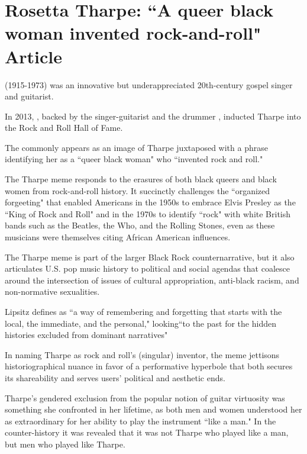 \documentclass[12pt, a4paper, twoside, openright, titlepage]{book}
\begin{document}
\section{Rosetta Tharpe: ``A queer black woman invented rock-and-roll" Article}


\begin{rmk}{}{}
     (1915-1973) was an innovative but underappreciated 20th-century gospel singer and guitarist.


    In 2013, , backed by the singer-guitarist  and the drummer , inducted Tharpe into the Rock and Roll Hall of Fame.
\end{rmk}

\begin{defn}{}{}
    The  commonly appears as an image of Tharpe juxtaposed with a phrase identifying her as a ``queer black woman" who ``invented rock and roll." 
\end{defn}

The Tharpe meme responds to the erasures of both black queers and black women from rock-and-roll history. It succinctly challenges the ``organized forgeeting" that enabled Americans in the 1950s to embrace Elvis Presley as the ``King of Rock and Roll" and in the 1970s to identify ``rock" with white British bands such as the Beatles, the Who, and the Rolling Stones, even as these musicians were themselves citing African American influences.

The Tharpe meme is part of the larger Black Rock counternarrative, but it also articulates U.S. pop music history to political and social agendas that coalesce around the intersection of issues of cultural appropriation, anti-black racism, and non-normative sexualities. 

\begin{defn}{}{}
    Lipsitz defines  as ``a way of remembering and forgetting that starts with the local, the immediate, and the personal," looking``to the past for the hidden histories excluded from dominant narratives"
\end{defn}

In naming Tharpe as rock and roll's (singular) inventor, the meme jettisons historiographical nuance in favor of a performative hyperbole that both secures its shareability and serves users' political and aesthetic ends.



Tharpe's gendered exclusion from the popular notion of guitar virtuosity was something she confronted in her lifetime, as both men and women understood her as extraordinary for her ability to play the instrument ``like a man." In the counter-history it was revealed that it was not Tharpe who played like a man, but men who played like Tharpe.
\end{document}
